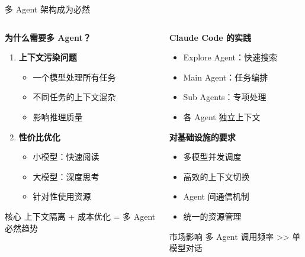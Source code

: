 \documentclass[aspectratio=169,xcolor=dvipsnames]{beamer}
\begin{document}
\begin{frame}{多 Agent 架构成为必然}
  \begin{columns}
    \begin{column}{0.48\textwidth}
      \textbf{为什么需要多 Agent？}
      \begin{enumerate}
        \item \textbf{上下文污染问题}
        \begin{itemize}
          \item 一个模型处理所有任务
          \item 不同任务的上下文混杂
          \item 影响推理质量
        \end{itemize}

        \item \textbf{性价比优化}
        \begin{itemize}
          \item 小模型：快速阅读
          \item 大模型：深度思考
          \item 针对性使用资源
        \end{itemize}
      \end{enumerate}

      \vspace{0.3cm}

      \begin{alertblock}{核心}
        上下文隔离 + 成本优化 = 多 Agent 必然趋势
      \end{alertblock}
    \end{column}
    \begin{column}{0.48\textwidth}
      \textbf{Claude Code 的实践}
      \begin{itemize}
        \item Explore Agent：快速搜索
        \item Main Agent：任务编排
        \item Sub Agents：专项处理
        \item 各 Agent 独立上下文
      \end{itemize}

      \vspace{0.3cm}

      \textbf{对基础设施的要求}
      \begin{itemize}
        \item 多模型并发调度
        \item 高效的上下文切换
        \item Agent 间通信机制
        \item 统一的资源管理
      \end{itemize}

      \vspace{0.3cm}

      \begin{exampleblock}{市场影响}
        多 Agent 调用频率 >> 单模型对话
      \end{exampleblock}
    \end{column}
  \end{columns}
\end{frame}
\end{document}
